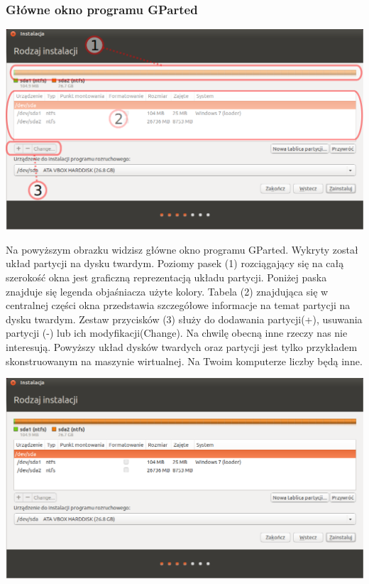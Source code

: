 \subsubsection{Główne okno programu GParted}
\begin{center}
        \includegraphics[scale=0.5]{images/instalator_partycjonowanie_gparted2.png}
\end{center}
Na powyższym obrazku widzisz główne okno programu GParted. Wykryty został układ partycji na dysku twardym. Poziomy pasek (1) rozciągający się na całą szerokość okna jest graficzną reprezentacją układu partycji. Poniżej paska znajduje się legenda objaśniacza użyte kolory. Tabela (2) znajdująca się w centralnej części okna przedstawia szczegółowe informacje na temat partycji na dysku twardym. Zestaw przycisków (3) służy do dodawania partycji(+), usuwania partycji (-) lub ich modyfikacji(Change). Na chwilę obecną inne rzeczy nas nie interesują.
Powyższy układ dysków twardych oraz partycji jest tylko przykładem skonstruowanym na maszynie wirtualnej. Na Twoim komputerze liczby będą inne.
\clearpage
\begin{center}
        \includegraphics[scale=0.5]{images/instalator_partycjonowanie_gparted2_czysty.png}
\end{center}
